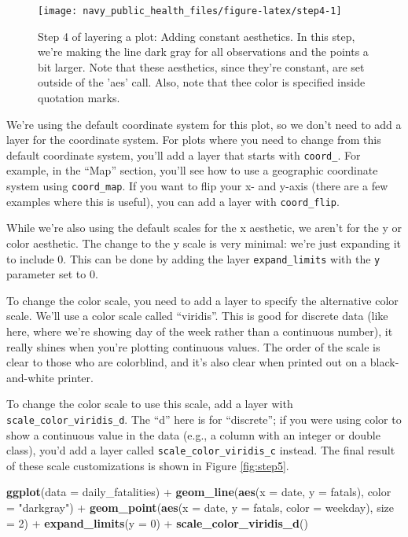 \documentclass[]{tufte-book}
\newenvironment{Shaded}{}{}
\newcommand{\DataTypeTok}[1]{\textcolor[rgb]{0.56,0.13,0.00}{#1}}
\newcommand{\DecValTok}[1]{\textcolor[rgb]{0.25,0.63,0.44}{#1}}
\newcommand{\KeywordTok}[1]{\textcolor[rgb]{0.00,0.44,0.13}{\textbf{#1}}}
\newcommand{\NormalTok}[1]{#1}
\newcommand{\OperatorTok}[1]{\textcolor[rgb]{0.40,0.40,0.40}{#1}}
\newcommand{\StringTok}[1]{\textcolor[rgb]{0.25,0.44,0.63}{#1}}
\begin{document}
\begin{figure*}
\texttt{[image: navy\_public\_health\_files/figure-latex/step4-1]} \caption[Step 4 of layering a plot]{Step 4 of layering a plot: Adding constant aesthetics. In this step, we're making the line dark gray for all observations and the points a bit larger. Note that these aesthetics, since they're constant, are set outside of the 'aes' call. Also, note that thee color is specified inside quotation marks.}\label{fig:step4}
\end{figure*}

We're using the default coordinate system for this plot, so we don't need to add
a layer for the coordinate system. For plots where you need to change from this
default coordinate system, you'll add a layer that starts with \texttt{coord\_}. For example,
in the ``Map'' section, you'll see how to use a geographic coordinate system using
\texttt{coord\_map}. If you want to flip your x- and y-axis (there are a few examples where
this is useful), you can add a layer with \texttt{coord\_flip}.

While we're also using the default scales for the x aesthetic, we aren't for
the y or color aesthetic. The change to the y scale is very minimal: we're just
expanding it to include 0. This can be done by adding the layer \texttt{expand\_limits}
with the \texttt{y} parameter set to 0.

To change the color scale, you need to add a layer to specify
the alternative color scale. We'll use a color scale called
``viridis''. This is good for discrete data (like here, where we're showing day of
the week rather than a continuous number), it really shines when you're plotting
continuous values. The order of the scale is clear to those who are colorblind, and
it's also clear when printed out on a black-and-white printer.

To change the color scale to use this scale, add a layer with \texttt{scale\_color\_viridis\_d}.
The ``d'' here is for ``discrete''; if you were using color to show a continuous
value in the data (e.g., a column with an integer or double class), you'd
add a layer called \texttt{scale\_color\_viridis\_c} instead. The final result of these
scale customizations is shown in Figure \ref{fig:step5}.

\begin{Shaded}
\begin{Highlighting}[]
\KeywordTok{ggplot}\NormalTok{(}\DataTypeTok{data =}\NormalTok{ daily_fatalities) }\OperatorTok{+}\StringTok{ }\KeywordTok{geom_line}\NormalTok{(}\KeywordTok{aes}\NormalTok{(}\DataTypeTok{x =}\NormalTok{ date, }
    \DataTypeTok{y =}\NormalTok{ fatals), }\DataTypeTok{color =} \StringTok{"darkgray"}\NormalTok{) }\OperatorTok{+}\StringTok{ }\KeywordTok{geom_point}\NormalTok{(}\KeywordTok{aes}\NormalTok{(}\DataTypeTok{x =}\NormalTok{ date, }
    \DataTypeTok{y =}\NormalTok{ fatals, }\DataTypeTok{color =}\NormalTok{ weekday), }\DataTypeTok{size =} \DecValTok{2}\NormalTok{) }\OperatorTok{+}\StringTok{ }
\StringTok{    }\KeywordTok{expand_limits}\NormalTok{(}\DataTypeTok{y =} \DecValTok{0}\NormalTok{) }\OperatorTok{+}\StringTok{ }\KeywordTok{scale_color_viridis_d}\NormalTok{()}
\end{Highlighting}
\end{Shaded}
\end{document}
